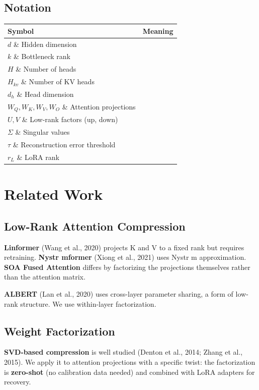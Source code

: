 \subsection{Notation}

\begin{table}[H]
\centering
\small
\begin{tabular}{ll}
\toprule
\textbf{Symbol} & \textbf{Meaning} \\
\midrule
$d$ \& Hidden dimension \\
$k$ \& Bottleneck rank \\
$H$ \& Number of heads \\
$H_{kv}$ \& Number of KV heads \\
$d_h$ \& Head dimension \\
$W_Q, W_K, W_V, W_O$ \& Attention projections \\
$U, V$ \& Low-rank factors (up, down) \\
$\Sigma$ \& Singular values \\
$\tau$ \& Reconstruction error threshold \\
$r_L$ \& LoRA rank \\
\bottomrule
\end{tabular}
\end{table}



\section{Related Work}

\subsection{Low-Rank Attention Compression}

\textbf{Linformer} (Wang et al., 2020) projects K and V to a fixed rank but requires 
retraining. \textbf{Nystr mformer} (Xiong et al., 2021) uses Nystr m approximation. 
\textbf{SOA Fused Attention} differs by factorizing the projections themselves 
rather than the attention matrix.

\textbf{ALBERT} (Lan et al., 2020) uses cross-layer parameter sharing, a form of 
low-rank structure. We use within-layer factorization.

\subsection{Weight Factorization}

\textbf{SVD-based compression} is well studied (Denton et al., 2014; Zhang et al., 
2015). We apply it to attention projections with a specific twist: the 
factorization is \textbf{zero-shot} (no calibration data needed) and combined 
with LoRA adapters for recovery.

